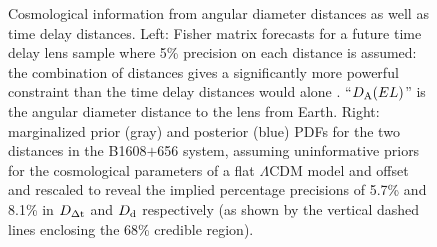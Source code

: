 \begin{figure}[!t]
\begin{minipage}{0.48\linewidth}
\end{minipage}
\caption{Cosmological information from angular diameter distances
as well as time delay distances. Left: Fisher matrix
forecasts for a future time delay lens sample where 5\% precision on
each distance is assumed: the combination of distances gives a
significantly more powerful constraint than the time delay distances
would alone \citep[reproduced from][]{JeeEtal2016}. ``$D_{\rm A}(EL)$'' is
the angular diameter distance to the lens from Earth. Right: marginalized
prior (gray) and posterior (blue) PDFs for the two
distances in the B1608$+$656 system, assuming uninformative priors for the
cosmological parameters of a flat $\Lambda$CDM model and offset and
rescaled to reveal the implied percentage precisions of 5.7\% and 8.1\%
in $D_{\Delta{\rm t}}$ and $D_{\rm d}$ respectively (as shown by the vertical dashed lines
enclosing the 68\% credible region). }
\label{fig:DdDdt}
\end{figure}


%
%



